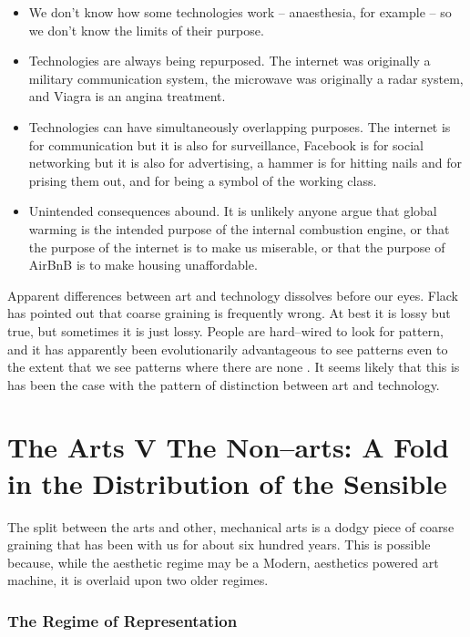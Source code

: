 \documentclass[letterpaper]{article}
\begin{document}
    \begin{itemize}
     
        \item We don't know how some technologies work – anaesthesia, for example – so we don't know the limits of their purpose.
    
        \item Technologies are always being repurposed. The internet was originally a military communication system, the microwave was originally a radar system, and Viagra is an angina treatment.

        \item Technologies can have simultaneously overlapping purposes. The internet is for communication but it is also for surveillance, Facebook is for social networking but it is also for advertising, a hammer is for hitting nails and for prising them out, and for being a symbol of the working class.

        \item Unintended consequences abound. It is unlikely anyone argue that global warming is the intended purpose of the internal combustion engine, or that the purpose of the internet is to make us miserable, or that the purpose of AirBnB is to make housing unaffordable.
    \end{itemize}

    Apparent differences between art and technology dissolves before our eyes. Flack has pointed out that coarse graining is frequently wrong. At best it is lossy but true, but sometimes it is just lossy. People are hard–wired to look for pattern, and it has apparently been evolutionarily advantageous to see patterns even to the extent that we see patterns where there are none \citep{FristonThFrEnrgPrncpl2010}. It seems likely that this is has been the case with the pattern of distinction between art and technology.

\section{The Arts V The Non–arts: A Fold in the Distribution of the Sensible}
    
    The split between the arts and other, mechanical arts is a dodgy piece of coarse graining that has been with us for about six hundred years. This is possible because, while the aesthetic regime may be a Modern, aesthetics powered art machine, it is overlaid upon two older regimes. 
    
    \subsubsection{The Regime of Representation}
\end{document}
